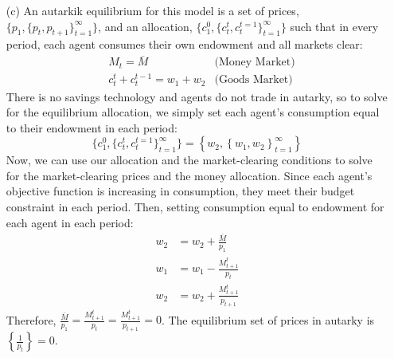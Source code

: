 \documentclass{article}
\begin{document}
\begin{itemize}
	\item[(c)] An autarkik equilibrium for this model is a set of prices, $\{p_1,\{p_t,p_{t+1}\}_{t=1}^\infty\}$, and an allocation, $\{c_1^0,\{c_t^t,c_t^{t=1}\}_{t=1}^\infty\}$ such that in every period, each agent consumes their own endowment and all markets clear:
		\begin{align*}
			&M_t = \overline{M}				&\text{(Money Market)} \\
			&c_t^t + c^{t-1}_t = w_1 + w_2 	&\text{(Goods Market)} 
		\end{align*}
		There is no savings technology and agents do not trade in autarky, so to solve for the equilibrium allocation, we simply set each agent's consumption equal to their endowment in each period:
		\[
			\{c_1^0,\{c_t^t,c_t^{t=1}\}_{t=1}^\infty\}=\left\{w_2,\left\{w_1,w_2\right\}_{t=1}^\infty\right\}
		\]
		Now, we can use our allocation and the market-clearing conditions to solve for the market-clearing prices and the money allocation. Since each agent's objective function is increasing in consumption, they meet their budget constraint in each period. Then, setting consumption equal to endowment for each agent in each period:
		\begin{align*}
			w_2 &= w_2 + \frac{\overline{M}}{p_1}	\\
			w_1 &= w_1 - \frac{M_{t+1}^t}{p_t}		\\
			w_2 &= w_2 + \frac{M_{t+1}^t}{p_{t+1}}
		\end{align*}
		Therefore, $\frac{\overline{M}}{p_1}=\frac{M_{t+1}^t}{p_t}=\frac{M_{t+1}^t}{p_{t+1}}=0$. The equilibrium set of prices in autarky is $\left\{\frac{1}{p_t}\right\}=0$.
		

\end{itemize}
\end{document}
